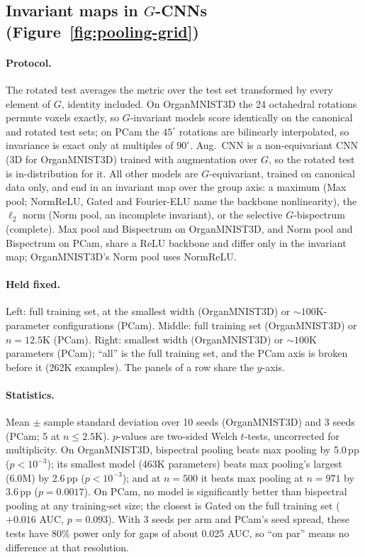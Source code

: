 \subsection{Invariant maps in $G$-CNNs (Figure~\ref{fig:pooling-grid})}
\label{app:pooling-grid}

\paragraph{Protocol.}
The rotated test averages the metric over the test set transformed by every element of $G$,
identity included. On OrganMNIST3D the 24 octahedral rotations permute voxels exactly, so
$G$-invariant models score identically on the canonical and rotated test sets; on PCam the
$45^\circ$ rotations are bilinearly interpolated, so invariance is exact only at multiples of
$90^\circ$. Aug.\ CNN is a non-equivariant CNN (3D for OrganMNIST3D) trained with augmentation
over $G$, so the rotated test is in-distribution for it. All other models are $G$-equivariant,
trained on canonical data only, and end in an invariant map over the group axis: a maximum (Max
pool; NormReLU, Gated and Fourier-ELU name the backbone nonlinearity), the $\ell_2$ norm (Norm
pool, an incomplete invariant), or the selective $G$-bispectrum (complete). Max pool and
Bispectrum on OrganMNIST3D, and Norm pool and Bispectrum on PCam, share a ReLU backbone and differ
only in the invariant map; OrganMNIST3D's Norm pool uses NormReLU.

\paragraph{Held fixed.}
Left: full training set, at the smallest width (OrganMNIST3D) or ${\sim}100$K-parameter
configurations (PCam). Middle: full training set (OrganMNIST3D) or $n = 12.5$K (PCam). Right:
smallest width (OrganMNIST3D) or ${\sim}100$K parameters (PCam); ``all'' is the full training set,
and the PCam axis is broken before it (262K examples). The panels of a row share the $y$-axis.

\paragraph{Statistics.}
Mean $\pm$ sample standard deviation over 10 seeds (OrganMNIST3D) and 3 seeds (PCam; 5 at
$n \le 2.5$K). $p$-values are two-sided Welch $t$-tests, uncorrected for multiplicity. On
OrganMNIST3D, bispectral pooling beats max pooling by 5.0\,pp ($p < 10^{-3}$); its smallest
model (463K parameters) beats max pooling's largest (6.0M) by 2.6\,pp
($p < 10^{-3}$); and at $n = 500$ it beats max pooling at $n = 971$ by
3.6\,pp ($p = 0.0017$). On PCam, no model is significantly better than bispectral
pooling at any training-set size; the closest is Gated on the full training set (${+}0.016$ AUC,
$p = 0.093$). With 3 seeds per arm and PCam's seed spread, these tests have 80\% power only for
gaps of about 0.025 AUC, so ``on par'' means no difference at that resolution.
